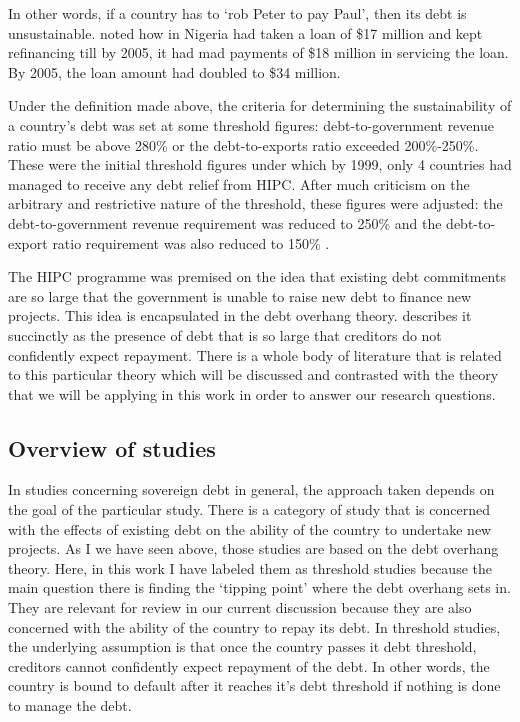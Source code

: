 \documentclass[12pt, a4paper]{article}
\begin{document}
	In other words, if a country has to  `rob Peter to pay Paul', then its debt is unsustainable.  noted how in Nigeria had taken a loan of \$17 million and kept refinancing till by 2005, it had mad payments of \$18 million in servicing the loan. By 2005, the loan amount had doubled to \$34 million. 
	
	Under the definition made above, the criteria for determining the sustainability of a country's debt was set at some threshold figures: debt-to-government revenue ratio must be above 280\% or the debt-to-exports ratio exceeded 200\%-250\%. These were the initial threshold figures under which by 1999, only 4 countries had managed to receive any debt relief from HIPC. After much criticism on the arbitrary and restrictive nature of the threshold, these figures were adjusted: the debt-to-government revenue requirement was reduced to 250\% and the debt-to-export ratio requirement was also reduced to 150\% \cite{carrasco2007foreign}.
	
	The HIPC programme was premised on the idea that existing debt commitments are so large that the government is unable to raise new debt to finance new projects. This idea is encapsulated in the debt overhang theory.  describes it succinctly as the presence of debt that is so large that creditors do not confidently expect repayment. There is a whole body of literature that is related to this particular theory which will be discussed and contrasted with the theory that we will be applying in this work in order to answer our research questions.
	
	\subsection{Overview of studies}
	In studies concerning sovereign debt in general, the approach taken depends on the goal of the particular study. There is a category of study that is concerned with the effects of existing debt on the ability of the country to undertake new projects. As I we have seen above, those studies are based on the debt overhang theory. Here, in this work I have labeled them as threshold studies because the main question there is finding the `tipping point' where the debt overhang sets in. They are relevant for review in our current discussion because they are also concerned with the ability of the country to repay its debt. In threshold studies, the underlying assumption is that once the country passes it debt threshold, creditors cannot confidently expect repayment of the debt. In other words, the country is bound to default after it reaches it's debt threshold if nothing is done to manage the debt. 
	
\end{document}
